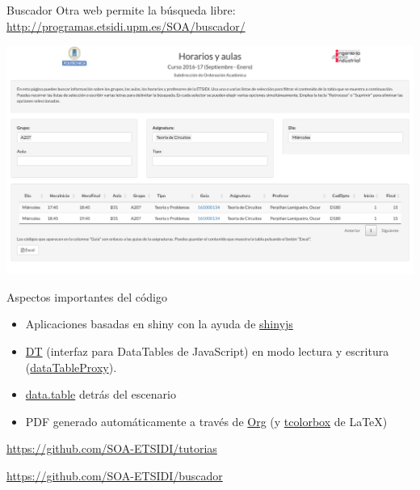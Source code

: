 \documentclass[spanish, xcolor={usenames,svgnames,dvipsnames}]{beamer}
\begin{document}
\begin{frame}[label={sec:org7c8d8b3}]{Buscador}
Otra web permite la búsqueda libre: \url{http://programas.etsidi.upm.es/SOA/buscador/}
\begin{center}
\includegraphics[width=.9\linewidth]{images/buscador.png}
\end{center}
\end{frame}


\begin{frame}[label={sec:org201d391}]{Aspectos importantes del código}
\begin{block}{}
\begin{itemize}
\item Aplicaciones basadas en shiny con la ayuda de \href{https://daattali.com/shiny/shinyjs-demo/}{shinyjs}
\item \href{https://github.com/Rdatatable/data.table/wiki}{DT} (interfaz para DataTables de JavaScript) en modo lectura y escritura (\href{https://yihui.shinyapps.io/DT-proxy/}{dataTableProxy}).
\item \href{https://github.com/Rdatatable/data.table/wiki}{data.table} detrás del escenario
\item PDF generado automáticamente a través de \href{http://orgmode.org/}{Org} (y \href{https://www.ctan.org/pkg/tcolorbox}{tcolorbox} de \LaTeX{})
\end{itemize}
\end{block}
\begin{block}{}
\url{https://github.com/SOA-ETSIDI/tutorias}

\url{https://github.com/SOA-ETSIDI/buscador}
\end{block}
\end{frame}
\end{document}
